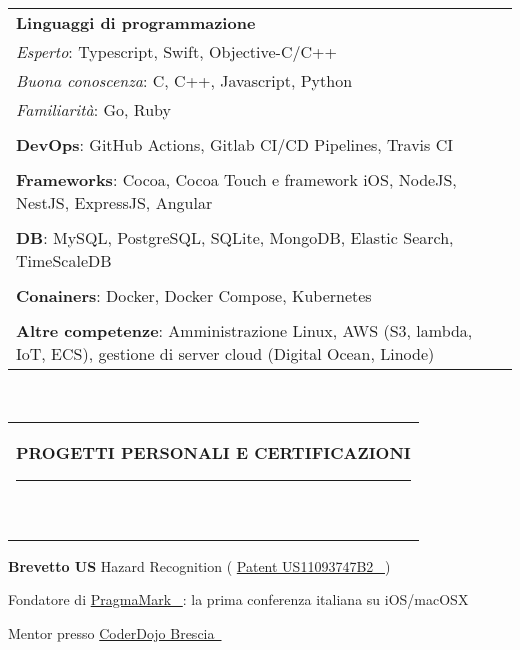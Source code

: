 \documentclass[10pt,A4]{article}
\newcommand{\mpwidth}{\linewidth-\fboxsep-\fboxsep}
\newcommand{\extLinkIcon}[2]{
	\textcolor{maincol}{\href{#1}{#2 \,\scriptsize{\faExternalLink} }}
}
\newcommand{\cvlist}[1] {
	\begin{itemize}{#1}\end{itemize}
}
\newcommand{\cvtext}[1] {
	\begin{tabular*}{1\mpwidth}{p{0.98\mpwidth}}
		\parbox{1\mpwidth}{#1}
	\end{tabular*}
}
\newcommand{\cvsection}[1] {
	\vspace{14pt}
	\cvtext{
		\textbf{\LARGE{\textcolor{darkcol}{\uppercase{#1}}}}\\[-4pt]
		\textcolor{maincol}{ \rule{0.1\textwidth}{2pt} } \\
	}
}
\begin{document}
\begin{paracol}{2}
\begin{leftcolumn}
\begin{tabular*}{1\mpwidth}{p{1\mpwidth}  r}
	\textbf{Linguaggi di programmazione}\\
	\textcolor{maincol}{\textit{Esperto}}: Typescript, Swift, Objective-C/C++\\
	\textcolor{maincol}{\textit{Buona conoscenza}}: C, C++, Javascript, Python\\
	\textcolor{maincol}{\textit{Familiarità}}: Go, Ruby \\ 
	\\
	\textbf{DevOps}: GitHub Actions, Gitlab CI/CD Pipelines, Travis CI \\
	\\
	\textbf{Frameworks}: Cocoa, Cocoa Touch e framework iOS, NodeJS, NestJS, ExpressJS, Angular \\
	\\
	\textbf{DB}: MySQL, PostgreSQL, SQLite, MongoDB, Elastic Search, TimeScaleDB \\
	\\
	\textbf{Conainers}: Docker, Docker Compose, Kubernetes \\
	\\
	\textbf{Altre competenze}: Amministrazione Linux, AWS (S3, lambda, IoT, ECS), gestione di server cloud (Digital Ocean, Linode)
\end{tabular*}\\[8pt] 

\cvsection{Progetti personali e certificazioni}
\cvlist{
	\item \textbf{Brevetto US} Hazard Recognition (\extLinkIcon{https://patents.google.com/patent/US11093747B2/en?oq=US11093747B2
	}{Patent US11093747B2})
	\item Fondatore di \extLinkIcon{http://pragmamark.org/}{PragmaMark}: la prima conferenza italiana su iOS/macOSX
	\item Mentor presso \extLinkIcon{http://www.coderdojobrescia.it/}{CoderDojo Brescia}
}


\mbox{}
\vfill
\mbox{}
\vfill
\mbox{}
\vfill
\mbox{}
\end{leftcolumn}
\begin{rightcolumn}
\vfill \vspace*{110pt}


\end{rightcolumn}
\end{paracol}
\end{document}
